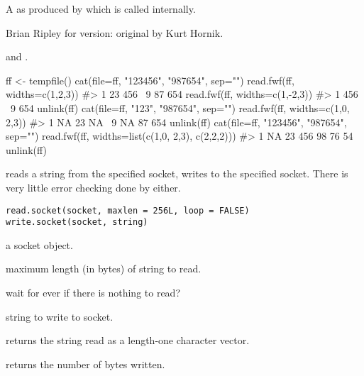 %
\begin{Value}
A  as produced by 
which is called internally.
\end{Value}
%
\begin{Author}\relax
Brian Ripley for \R{} version: original  by Kurt Hornik.
\end{Author}
%
\begin{SeeAlso}\relax
{} and .
\end{SeeAlso}
%
\begin{Examples}
\begin{ExampleCode}
ff <- tempfile()
cat(file=ff, "123456", "987654", sep="\n")
read.fwf(ff, widths=c(1,2,3))    #> 1 23 456 \ 9 87 654
read.fwf(ff, widths=c(1,-2,3))   #> 1 456 \ 9 654
unlink(ff)
cat(file=ff, "123", "987654", sep="\n")
read.fwf(ff, widths=c(1,0, 2,3))    #> 1 NA 23 NA \ 9 NA 87 654
unlink(ff)
cat(file=ff, "123456", "987654", sep="\n")
read.fwf(ff, widths=list(c(1,0, 2,3), c(2,2,2))) #> 1 NA 23 456 98 76 54
unlink(ff)
\end{ExampleCode}
\end{Examples}
%
\begin{Description}\relax
{} reads a string from the specified socket,
 writes to the specified socket.  There is very
little error checking done by either.
\end{Description}
%
\begin{Usage}
\begin{verbatim}
read.socket(socket, maxlen = 256L, loop = FALSE)
write.socket(socket, string)
\end{verbatim}
\end{Usage}
%
\begin{Arguments}
\begin{ldescription}
\item[\code{socket}] a socket object.
\item[\code{maxlen}] maximum length (in bytes) of string to read.
\item[\code{loop}] wait for ever if there is nothing to read?
\item[\code{string}] string to write to socket.
\end{ldescription}
\end{Arguments}
%
\begin{Value}
 returns the string read as a length-one character vector.

 returns the number of bytes written.

\end{Value}
